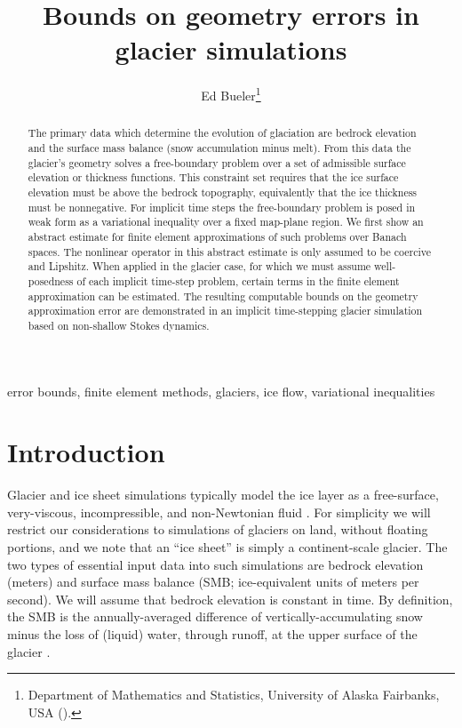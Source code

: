 \documentclass[hidelinks,onefignum,onetabnum,final]{siamart220329}  %
\title{Bounds on geometry errors in glacier simulations}
\author{Ed Bueler\thanks{Department of Mathematics and Statistics, University of Alaska Fairbanks, USA (\email{elbueler@alaska.edu}).}}
\begin{document}
\maketitle

\begin{abstract}
The primary data which determine the evolution of glaciation are bedrock elevation and the surface mass balance (snow accumulation minus melt).  From this data the glacier's geometry solves a free-boundary problem over a set of admissible surface elevation or thickness functions.  This constraint set requires that the ice surface elevation must be above the bedrock topography, equivalently that the ice thickness must be nonnegative.  For implicit time steps the free-boundary problem is posed in weak form as a variational inequality over a fixed map-plane region.  We first show an abstract estimate for finite element approximations of such problems over Banach spaces.  The nonlinear operator in this abstract estimate is only assumed to be coercive and Lipshitz.  When applied in the glacier case, for which we must assume well-posedness of each implicit time-step problem, certain terms in the finite element approximation can be estimated.  The resulting computable bounds on the geometry approximation error are demonstrated in an implicit time-stepping glacier simulation based on non-shallow Stokes dynamics.
\end{abstract}

\begin{keywords}
error bounds, finite element methods, glaciers, ice flow, variational inequalities
\end{keywords}



\section{Introduction} \label{sec:intro}

Glacier and ice sheet simulations typically model the ice layer as a free-surface, very-viscous, incompressible, and non-Newtonian fluid \cite{GreveBlatter2009,SchoofHewitt2013}.  For simplicity we will restrict our considerations to simulations of glaciers on land, without floating portions, and we note that an ``ice sheet'' is simply a continent-scale glacier.  The two types of essential input data into such simulations are bedrock elevation (meters) and surface mass balance (SMB; ice-equivalent units of meters per second).  We will assume that bedrock elevation is constant in time.  By definition, the SMB is the annually-averaged difference of vertically-accumulating snow minus the loss of (liquid) water, through runoff, at the upper surface of the glacier \cite{Cogleyetal2011}.
\end{document}
